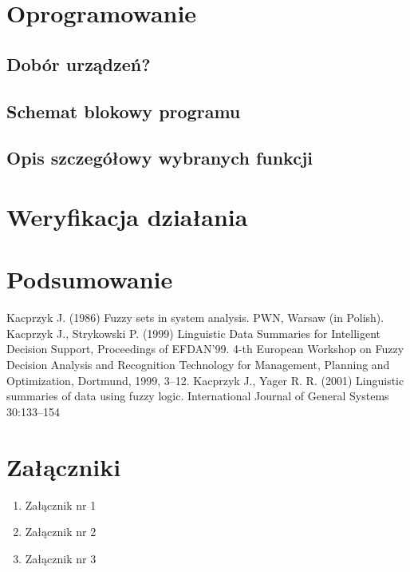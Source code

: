 \documentclass[12pt]{report}
\begin{document}
\chapter{Oprogramowanie}

\section{Dobór urządzeń?}
\section{Schemat blokowy programu}
\section{Opis szczegółowy wybranych funkcji}
\chapter{Weryfikacja działania}
\chapter{Podsumowanie}
\begin{thebibliography}{99}
Kacprzyk J. (1986) Fuzzy sets in system analysis.  PWN, Warsaw (in Polish).
Kacprzyk J., Strykowski P. (1999) Linguistic Data Summaries for Intelligent Decision Support, Proceedings of EFDAN'99. 4-th European Workshop on Fuzzy Decision Analysis and Recognition Technology for Management, Planning and Optimization, Dortmund, 1999, 3--12.
Kacprzyk J., Yager R. R. (2001) Linguistic summaries of data using fuzzy logic. International Journal of General Systems 30:133--154 

\end{thebibliography}

\listoffigures

\listoftables


\chapter*{Załączniki}
\begin{enumerate}
\item Załącznik nr 1
\item Załącznik nr 2
\item Załącznik nr 3
\end{enumerate}
\end{document}

